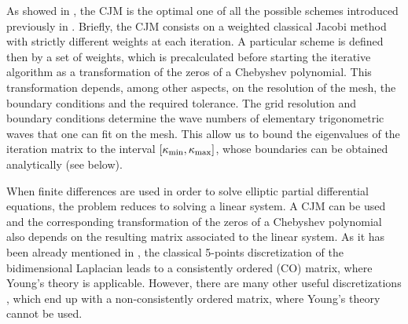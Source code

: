 \documentclass[preprint,12pt]{elsarticle}
\newcommand{\kmin}{\kappa_{\rm min}}
\newcommand{\kmax}{\kappa_{\rm max}}
\begin{document}
 As showed in \mbox{\cite{Adsuara2017446}},
the CJM is the optimal one of all the possible
schemes introduced previously in \cite{YangMittal2014, Adsuetal15,
  Adsuara2016369}. Briefly, the CJM consists on a weighted classical
Jacobi method with strictly different weights at each iteration. A
particular scheme is defined then by a set of weights, which is
precalculated before starting the iterative algorithm as a
transformation of the zeros of a Chebyshev polynomial. This
transformation depends, among other aspects, on the resolution of the
mesh, the boundary conditions and the required
tolerance. The grid resolution and boundary conditions
  determine the wave numbers of elementary trigonometric
  waves that one can fit on the mesh. This allow us to bound the eigenvalues 
  of the iteration matrix to the interval $[\kmin,\kmax]$, whose boundaries can
  be obtained analytically (see below).

When finite differences are used in order to solve elliptic partial differential equations, the problem reduces to solving a linear system. A CJM can be used and the corresponding transformation of the zeros of a Chebyshev polynomial also depends on the resulting matrix associated to the linear system. As it has been already mentioned in \cite{Adsuara2017446}, the classical 5-points discretization of the bidimensional Laplacian leads to a consistently ordered (CO) matrix, where Young's theory is applicable. However, there are many other useful discretizations \cite{Adams:1988}, which end up with a non-consistently ordered matrix, where Young's theory cannot be used.
\end{document}
